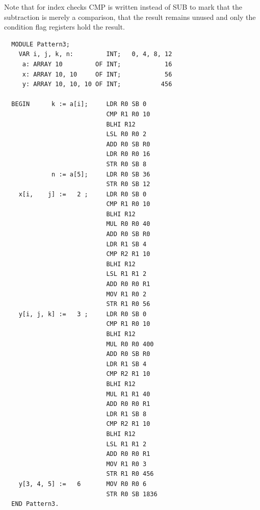Note that for index checks CMP is written instead of SUB to mark that the subtraction is merely a
comparison, that the result remains unused and only the condition flag registers hold the result.
\begin{verbatim}
  MODULE Pattern3;
    VAR i, j, k, n:         INT;   0, 4, 8, 12 
     a: ARRAY 10         OF INT;            16
     x: ARRAY 10, 10     OF INT;            56
     y: ARRAY 10, 10, 10 OF INT;           456

  BEGIN      k := a[i];     LDR R0 SB 0
                            CMP R1 R0 10
                            BLHI R12
                            LSL R0 R0 2
                            ADD R0 SB R0
                            LDR R0 R0 16
                            STR R0 SB 8
             n := a[5];     LDR R0 SB 36
                            STR R0 SB 12
    x[i,    j] :=   2 ;     LDR R0 SB 0
                            CMP R1 R0 10
                            BLHI R12
                            MUL R0 R0 40
                            ADD R0 SB R0
                            LDR R1 SB 4
                            CMP R2 R1 10
                            BLHI R12
                            LSL R1 R1 2
                            ADD R0 R0 R1
                            MOV R1 R0 2
                            STR R1 R0 56
    y[i, j, k] :=   3 ;     LDR R0 SB 0
                            CMP R1 R0 10
                            BLHI R12
                            MUL R0 R0 400
                            ADD R0 SB R0
                            LDR R1 SB 4
                            CMP R2 R1 10
                            BLHI R12
                            MUL R1 R1 40
                            ADD R0 R0 R1
                            LDR R1 SB 8
                            CMP R2 R1 10
                            BLHI R12
                            LSL R1 R1 2
                            ADD R0 R0 R1
                            MOV R1 R0 3
                            STR R1 R0 456  
    y[3, 4, 5] :=   6       MOV R0 R0 6
                            STR R0 SB 1836
  END Pattern3.
\end{verbatim}

